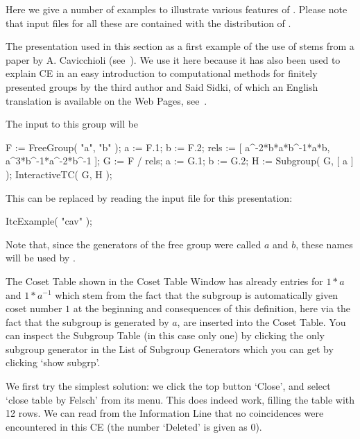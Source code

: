 

Here we give a number of examples to illustrate various features of
{\ITC}. Please note that input files for all these are contained with
the distribution of {\ITC}.



The presentation used in this section as a first example of the use of
{\ITC} stems from a paper by A. Cavicchioli (see~\cite{Cav86}). We
use it here because it has also been used to explain CE in an easy
introduction to computational methods for finitely presented groups by
the third author and Said Sidki, of which an English translation is
available on the {\GAP} Web Pages,
see~.

The {\GAP} input to this group will be

\begintt
F := FreeGroup( "a", "b" );
a := F.1; b := F.2;
rels := [ a^-2*b*a*b^-1*a*b, a^3*b^-1*a^-2*b^-1 ];
G := F / rels;
a := G.1; b := G.2;
H := Subgroup( G, [ a ] );
InteractiveTC( G, H );
\endtt

This can be replaced by reading the input file for this presentation:

\begintt
ItcExample( "cav" );
\endtt

Note that, since the generators of the free group were called $a$ and
$b$, these names will be used by {\ITC}.

The {\ITC} Coset Table shown in the Coset Table Window has already
entries for $1*a$ and $1*a^{-1}$ which stem from the fact that the
subgroup is automatically given coset number $1$ at the beginning and
consequences of this definition, here via the fact that the subgroup
is generated by $a$, are inserted into the Coset Table. You can
inspect the Subgroup Table (in this case only one) by clicking the
only subgroup generator in the List of Subgroup Generators which you
can get by clicking `show subgrp'.

We first try the simplest solution: we click the top button
`Close', and select `close table by Felsch' from its menu. This does
indeed work, filling the table with 12 rows. We can read from the
Information Line that no coincidences were encountered in this CE (the
number `Deleted' is given as 0).

